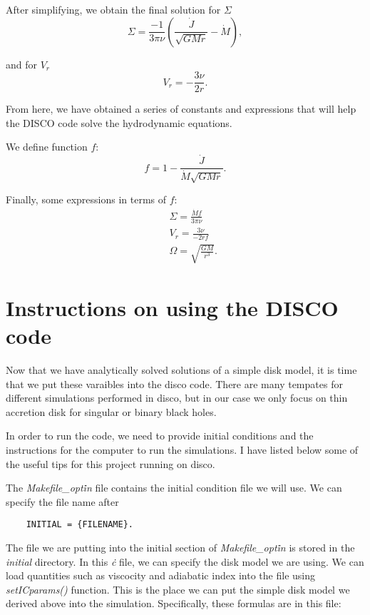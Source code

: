 \documentclass{article}
\begin{document}
After simplifying, we obtain the final solution for $\Sigma$
\begin{equation}
    \Sigma = \frac{-1}{3\pi \nu} \left(\frac{\dot J}{\sqrt{GMr}} - \dot M\right),
\end{equation}

and for $V_r$ 
\begin{equation}
    V_r = -\frac{3\nu}{2r}.
\end{equation}

From here, we have obtained a series of constants and expressions that will help the DISCO code solve the hydrodynamic equations.

We define function $f$:
\begin{equation}
    f = 1 - \frac{\dot J}{ \dot M \sqrt{GMr}}.
\end{equation}

Finally, some expressions in terms of $f$:
\begin{eqnarray}
    && \Sigma = \frac{\dot M f }{ 3 \pi \nu} \nonumber \\
    && V_r = \frac{3\nu}{-2rf} \nonumber \\
    && \Omega = \sqrt{\frac{GM}{r^3}}.
\end{eqnarray}


\section{Instructions on using the DISCO code}

Now that we have analytically solved solutions of a simple disk model, it is time that we put these varaibles into the 
disco code. There are many tempates for different simulations performed in disco, but in our case we only focus on
thin accretion disk for singular or binary black holes. 

In order to run the code, we need to provide initial conditions and the instructions for the computer to run the simulations.
I have listed below some of the useful tips for this project running on disco.

The \emph{Makefile\_opt\.in} file contains the initial condition file we will use. We can specify the file name after

\begin{verbatim}
    INITIAL = {FILENAME}.
\end{verbatim}

The file we are putting into the initial section of \emph{Makefile\_opt\.in} is stored in the \emph{initial} directory. 
In this \emph{\.c} file, we can specify the disk model we are using. We can load quantities such as viscocity and adiabatic index into the file using
\emph{setICparams()} function. This is the place we can put the simple disk model we derived above into the simulation.
Specifically, these formulas are in this file:
\end{document}
